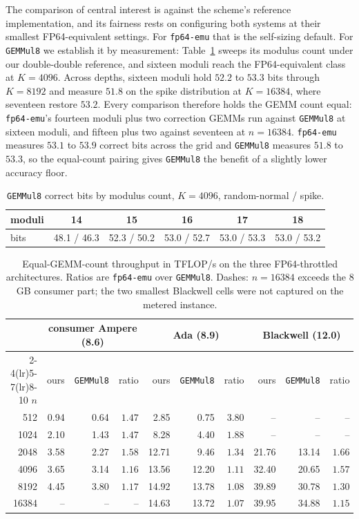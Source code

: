 \documentclass[11pt]{amsart}
\theoremstyle{plain}
\theoremstyle{definition}
\newcommand{\code}[1]{\texttt{#1}}
\newcommand{\fpemu}{\code{fp64-emu}}
\newcommand{\gemmul}{\code{GEMMul8}}
\begin{document}
The comparison of central interest is against the scheme's reference
implementation, and its fairness rests on configuring both systems at
their smallest FP64-equivalent settings. For \fpemu{} that is the
self-sizing default. For \gemmul{} we establish it by measurement:
Table~\ref{tab:g8sweep} sweeps its modulus count under our double-double
reference, and sixteen moduli reach the FP64-equivalent class at
$K = 4096$. Across depths, sixteen moduli hold $52.2$ to $53.3$ bits
through $K = 8192$ and measure $51.8$ on the spike distribution at
$K = 16384$, where seventeen restore $53.2$. Every comparison therefore
holds the GEMM count equal: \fpemu{}'s fourteen moduli plus two correction
GEMMs run against \gemmul{} at sixteen moduli, and fifteen plus two
against seventeen at $n = 16384$. \fpemu{} measures $53.1$ to $53.9$
correct bits across the grid and \gemmul{} measures $51.8$ to $53.3$, so
the equal-count pairing gives \gemmul{} the benefit of a slightly lower
accuracy floor.

\begin{table}[t]
\centering
\caption{\gemmul{} correct bits by modulus count, $K = 4096$,
random-normal / spike.}
\label{tab:g8sweep}
\begin{tabular}{lccccc}
\toprule
moduli & 14 & 15 & 16 & 17 & 18 \\
\midrule
bits & 48.1 / 46.3 & 52.3 / 50.2 & 53.0 / 52.7 & 53.0 / 53.3 & 53.0 / 53.2 \\
\bottomrule
\end{tabular}
\end{table}

\begin{table}[t]
\centering
\caption{Equal-GEMM-count throughput in TFLOP/s on the three
FP64-throttled architectures. Ratios are \fpemu{} over \gemmul{}. Dashes:
$n = 16384$ exceeds the 8 GB consumer part; the two smallest Blackwell
cells were not captured on the metered instance.}
\label{tab:gemmul8}
\small
\setlength{\tabcolsep}{4.5pt}
\begin{tabular}{r rrr rrr rrr}
\toprule
 & \multicolumn{3}{c}{consumer Ampere (8.6)} & \multicolumn{3}{c}{Ada (8.9)} & \multicolumn{3}{c}{Blackwell (12.0)} \\
\cmidrule(lr){2-4}\cmidrule(lr){5-7}\cmidrule(lr){8-10}
$n$ & ours & \gemmul{} & ratio & ours & \gemmul{} & ratio & ours & \gemmul{} & ratio \\
\midrule
512 & 0.94 & 0.64 & $1.47$ & 2.85 & 0.75 & $3.80$ & -- & -- & -- \\
1024 & 2.10 & 1.43 & $1.47$ & 8.28 & 4.40 & $1.88$ & -- & -- & -- \\
2048 & 3.58 & 2.27 & $1.58$ & 12.71 & 9.46 & $1.34$ & 21.76 & 13.14 & $1.66$ \\
4096 & 3.65 & 3.14 & $1.16$ & 13.56 & 12.20 & $1.11$ & 32.40 & 20.65 & $1.57$ \\
8192 & 4.45 & 3.80 & $1.17$ & 14.92 & 13.78 & $1.08$ & 39.89 & 30.78 & $1.30$ \\
16384 & -- & -- & -- & 14.63 & 13.72 & $1.07$ & 39.95 & 34.88 & $1.15$ \\
\bottomrule
\end{tabular}
\end{table}
\end{document}
